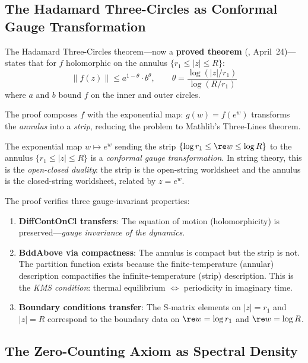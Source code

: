 \subsection{The Hadamard Three-Circles as Conformal Gauge Transformation}

The Hadamard Three-Circles theorem---now a \textbf{proved theorem}
(, April~24)---states that for $f$
holomorphic on the annulus $\{r_1 \leq |z| \leq R\}$:
\[
  \|f(z)\| \leq a^{1-\theta} \cdot b^\theta,
  \qquad \theta = \frac{\log(|z|/r_1)}{\log(R/r_1)}
\]
where $a$ and $b$ bound $f$ on the inner and outer circles.

The proof composes $f$ with the exponential map: $g(w) = f(e^w)$
transforms the \emph{annulus} into a \emph{strip}, reducing the
problem to Mathlib's Three-Lines theorem.

\begin{correspondence}
The exponential map $w \mapsto e^w$ sending the strip
$\{\log r_1 \leq \re w \leq \log R\}$ to the annulus
$\{r_1 \leq |z| \leq R\}$ is a \emph{conformal gauge transformation}.
In string theory, this is the \emph{open-closed duality}: the strip
is the open-string worldsheet and the annulus is the closed-string
worldsheet, related by $z = e^w$.

The proof verifies three gauge-invariant properties:
\begin{enumerate}
  \item \textbf{DiffContOnCl transfers}: The equation of motion
    (holomorphicity) is preserved---\emph{gauge invariance of the
    dynamics}.
  \item \textbf{BddAbove via compactness}: The annulus is compact but
    the strip is not. The partition function exists because the
    finite-temperature (annular) description compactifies the
    infinite-temperature (strip) description. This is the
    \emph{KMS condition}: thermal equilibrium $\Leftrightarrow$
    periodicity in imaginary time.
  \item \textbf{Boundary conditions transfer}: The S-matrix elements
    on $|z| = r_1$ and $|z| = R$ correspond to the boundary data on
    $\re w = \log r_1$ and $\re w = \log R$.
\end{enumerate}
\end{correspondence}

\subsection{The Zero-Counting Axiom as Spectral Density}

